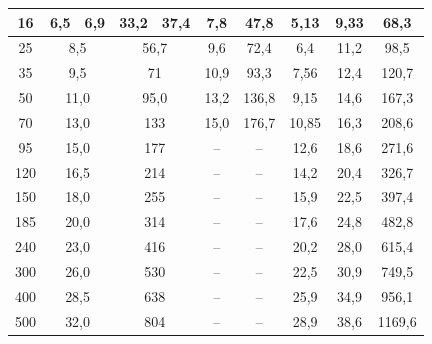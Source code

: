 \documentclass[12pt,openright,oneside,a4paper,brazil]{abntex2}
\begin{document}
\begin{table}[H]
\begin{sideways}
\begin{minipage}{\textheight}
{\begin{tabular}{c|c|c|c|c|c|c|c|c|c}
            16 & 6,5 & 6,9 & 33,2 & 37,4 & 7,8 & 47,8 & 5,13 & 9,33 & 68,3 \\ \hline
            25 & \multicolumn{2}{c|}{8,5} & \multicolumn{2}{c|}{56,7} & 9,6 & 72,4 & 6,4 & 11,2 & 98,5 \\ \hline
            35 & \multicolumn{2}{c|}{9,5} & \multicolumn{2}{c|}{71} & 10,9 & 93,3 & 7,56 & 12,4 & 120,7 \\ \hline
            50 & \multicolumn{2}{c|}{11,0} & \multicolumn{2}{c|}{95,0} & 13,2 & 136,8 & 9,15 & 14,6 & 167,3 \\ \hline
            70 & \multicolumn{2}{c|}{13,0} & \multicolumn{2}{c|}{133} & 15,0 & 176,7 & 10,85 & 16,3 & 208,6 \\ \hline
            95 & \multicolumn{2}{c|}{15,0} & \multicolumn{2}{c|}{177} & -- & -- & 12,6 & 18,6 & 271,6 \\ \hline
            120 & \multicolumn{2}{c|}{16,5} & \multicolumn{2}{c|}{214} & -- & -- & 14,2 & 20,4 & 326,7 \\ \hline
            150 & \multicolumn{2}{c|}{18,0} & \multicolumn{2}{c|}{255} & -- & -- & 15,9 & 22,5 & 397,4 \\ \hline
            185 & \multicolumn{2}{c|}{20,0} & \multicolumn{2}{c|}{314} & -- & -- & 17,6 & 24,8 & 482,8 \\ \hline
            240 & \multicolumn{2}{c|}{23,0} & \multicolumn{2}{c|}{416} & -- & -- & 20,2 & 28,0 & 615,4 \\ \hline
            300 & \multicolumn{2}{c|}{26,0} & \multicolumn{2}{c|}{530} & -- & -- & 22,5 & 30,9 & 749,5 \\ \hline
            400 & \multicolumn{2}{c|}{28,5} & \multicolumn{2}{c|}{638} & -- & -- & 25,9 & 34,9 & 956,1 \\ \hline
            500 & \multicolumn{2}{c|}{32,0} & \multicolumn{2}{c|}{804} & -- & -- & 28,9 & 38,6 & 1169,6 \\ \hline
        \end{tabular}%
        }
        
        \vspace{0.15cm}
    \end{minipage}
\end{sideways}

\end{table} 

\postextual
\end{document}
